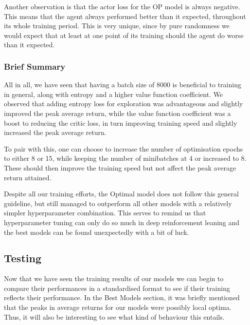Another observation is that the actor loss for the OP model is always negative. This means that the agent always performed better than it expected, throughout its whole training period. This is very unique, since by pure randomness we would expect that at least at one point of its training should the agent do worse than it expected.


\subsubsection{Brief Summary}

All in all, we have seen that having a batch size of 8000 is beneficial to training in general, along with entropy and a higher value function coefficient. We observed that adding entropy loss for exploration was advantageous and slightly improved the peak average return, while the value function coefficient was a boost to reducing the critic loss, in turn improving training speed and slightly increased the peak average return.

To pair with this, one can choose to increase the number of optimisation epochs to either 8 or 15, while keeping the number of minibatches at 4 or increased to 8. These should then improve the training speed but not affect the peak average return attained.

Despite all our training efforts, the Optimal model does not follow this general guideline, but still managed to outperform all other models with a relatively simpler hyperparameter combination. This serves to remind us that hyperparameter tuning can only do so much in deep reinforcement leaning and the best models can be found unexpectedly with a bit of luck.


\subsection{Testing}
Now that we have seen the training results of our models we can begin to compare their performances in a standardised format to see if their training reflects their performance. In the Best Models section, it was briefly mentioned that the peaks in average returns for our models were possibly local optima. Thus, it will also be interesting to see what kind of behaviour this entails.

